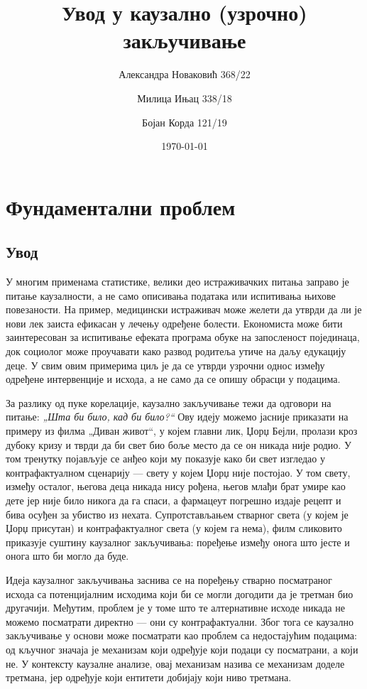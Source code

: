 \documentclass[12pt, a4paper]{article}
\title{Увод у каузално (узрочно) закључивање}
\author{Александра Новаковић 368/22}
\author{Милица Ињац 338/18}
\author{Бојан Корда 121/19}
\affil{Математички факултет, Универзитет у Београду}
\date{\today}
\begin{document}
\maketitle
\newpage

\tableofcontents
\newpage

\section{Фундаментални проблем}
\subsection{Увод}
У многим применама статистике, велики део истраживачких питања заправо је питање каузалности, а не само описивања података или испитивања њихове повезаности.
На пример, медицински истраживач може желети да утврди да ли је нови лек заиста ефикасан у лечењу одређене болести. Економиста може бити заинтересован за 
испитивање ефеката програма обуке на запосленост појединаца, док социолог може проучавати како развод родитеља утиче на даљу едукацију деце. 
У свим овим примерима циљ је да се утврди узрочни однос између одређене интервенције и исхода, а не само да се опишу обрасци у подацима.

За разлику од пуке корелације, каузално закључивање тежи да одговори на питање: \textit{„Шта би било, кад би било?“} Ову идеју можемо јасније приказати на примеру из 
филма „Диван живот“, у којем главни лик, Џорџ Бејли, пролази кроз дубоку кризу и тврди да би свет био боље место да се он никада није родио. У том тренутку појављује 
се анђео који му показује како би свет изгледао у контрафактуалном сценарију — свету у којем Џорџ није постојао. У том свету, између осталог, његова деца никада нису 
рођена, његов млађи брат умире као дете јер није било никога да га спаси, а фармацеут погрешно издаје рецепт и бива осуђен за убиство из нехата. Супротстављањем 
стварног света (у којем је Џорџ присутан) и контрафактуалног света (у којем га нема), филм сликовито приказује суштину каузалног закључивања: поређење између онога 
што јесте и онога што би могло да буде.

Идеја каузалног закључивања заснива се на поређењу стварно посматраног исхода са потенцијалним исходима који би се могли догодити да је третман био другачији. 
Међутим, проблем је у томе што те алтернативне исходе никада не можемо посматрати директно — они су контрафактуални. Због тога се каузално закључивање у 
основи може посматрати као проблем са недостајућим подацима: од кључног значаја је механизам који одређује који подаци су посматрани, а који не. У контексту 
каузалне анализе, овај механизам назива се механизам доделе третмана, јер одређује који ентитети добијају који ниво третмана.
\end{document}
